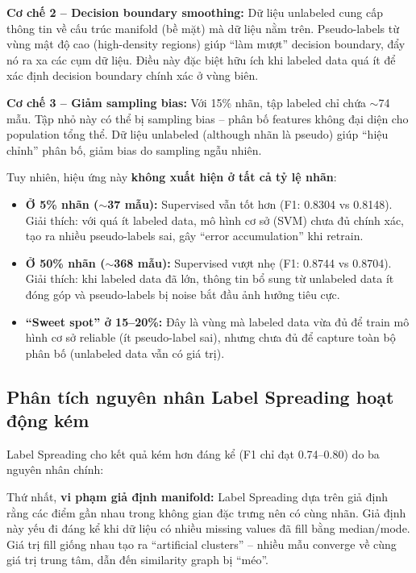 \textbf{Cơ chế 2 -- Decision boundary smoothing:} Dữ liệu unlabeled cung cấp thông tin về cấu trúc manifold (bề mặt) mà dữ liệu nằm trên. Pseudo-labels từ vùng mật độ cao (high-density regions) giúp ``làm mượt'' decision boundary, đẩy nó ra xa các cụm dữ liệu. Điều này đặc biệt hữu ích khi labeled data quá ít để xác định decision boundary chính xác ở vùng biên.

\textbf{Cơ chế 3 -- Giảm sampling bias:} Với 15\% nhãn, tập labeled chỉ chứa $\sim$74 mẫu. Tập nhỏ này có thể bị sampling bias -- phân bố features không đại diện cho population tổng thể. Dữ liệu unlabeled (although nhãn là pseudo) giúp ``hiệu chỉnh'' phân bố, giảm bias do sampling ngẫu nhiên.

Tuy nhiên, hiệu ứng này \textbf{không xuất hiện ở tất cả tỷ lệ nhãn}:
\begin{itemize}
    \item \textbf{Ở 5\% nhãn ($\sim$37 mẫu):} Supervised vẫn tốt hơn (F1: 0.8304 vs 0.8148). Giải thích: với quá ít labeled data, mô hình cơ sở (SVM) chưa đủ chính xác, tạo ra nhiều pseudo-labels sai, gây ``error accumulation'' khi retrain.
    \item \textbf{Ở 50\% nhãn ($\sim$368 mẫu):} Supervised vượt nhẹ (F1: 0.8744 vs 0.8704). Giải thích: khi labeled data đã lớn, thông tin bổ sung từ unlabeled data ít đóng góp và pseudo-labels bị noise bắt đầu ảnh hưởng tiêu cực.
    \item \textbf{``Sweet spot'' ở 15--20\%:} Đây là vùng mà labeled data vừa đủ để train mô hình cơ sở reliable (ít pseudo-label sai), nhưng chưa đủ để capture toàn bộ phân bố (unlabeled data vẫn có giá trị).
\end{itemize}

\subsection{Phân tích nguyên nhân Label Spreading hoạt động kém}

Label Spreading \cite{zhou2004learning} cho kết quả kém hơn đáng kể (F1 chỉ đạt 0.74--0.80) do ba nguyên nhân chính:

Thứ nhất, \textbf{vi phạm giả định manifold:} Label Spreading dựa trên giả định rằng các điểm gần nhau trong không gian đặc trưng nên có cùng nhãn. Giả định này yếu đi đáng kể khi dữ liệu có nhiều missing values đã fill bằng median/mode. Giá trị fill giống nhau tạo ra ``artificial clusters'' -- nhiều mẫu converge về cùng giá trị trung tâm, dẫn đến similarity graph bị ``méo''.

